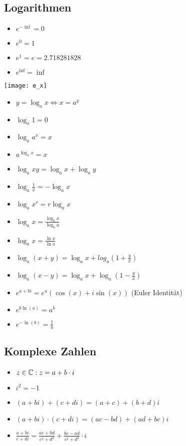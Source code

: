 \subsection{Logarithmen}
\begin{itemize}[leftmargin=*]
  \item $e^{-\inf} = 0$
  \item $e^0 = 1$
  \item $e^1 = e =  2.718281828$
  \item $e^{\inf} = \inf$
\end{itemize}
\texttt{[image: e\_x]}
\begin{itemize}[leftmargin=*]
  \item $y = \log_a x \Leftrightarrow x = a^y$
  \item $\log_a 1 = 0$
  \item $\log_a a^x = x$
  \item $a^{\log_a x} = x $
  \item $\log_a xy = \log_a x + \log_a y$
  \item $\log_a \frac{1}{x} = - \log_a x$
  \item $\log_a x^r = r \log_a x$
  \item $\log_a x = \frac{\log_b x}{\log_b a}$
  \item $\log_a x = \frac{\ln x}{\ln a}$
  \item $\log_a (x+y) = \log_a x + log_a (1 + \frac{y}{x})$
  \item $\log_a (x-y) = \log_a x + \log_a (1- \frac{y}{x})$
  \item $e^{a+bi} = e^a(\cos(x) + i \sin(x))$ (Euler Identität)
  \item $e^{b \ln(a)} = a^b$
  \item $ e^{-\ln(b)} = \frac{1}{b}$
\end{itemize}

\subsection{Komplexe Zahlen}
\begin{itemize}[leftmargin=*]
	\item $z \in \mathbb{C}: z = a + b\cdot i$
	\item $i^2 = -1$
	\item $(a + bi) + (c + di) = (a + c) + (b + d)i$
	\item $(a + bi) \cdot (c + di) = (ac - bd) + (ad + bc)i$
	\item $\frac{a + bi}{c + di} = \frac{ac + bd}{c^2 + d^2} + \frac{bc - ad}{c^2 + d^2}\cdot i$
\end{itemize}

